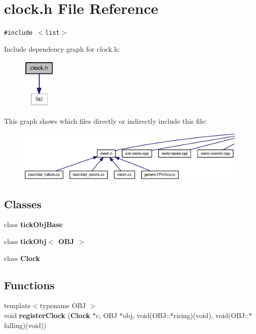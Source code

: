 \section{clock.h File Reference}
\label{clock_8h}
{\tt \#include $<$list$>$}\par


Include dependency graph for clock.h:\nopagebreak
\begin{figure}[H]
\begin{center}
\leavevmode
\includegraphics[width=46pt]{clock_8h__incl}
\end{center}
\end{figure}


This graph shows which files directly or indirectly include this file:\nopagebreak
\begin{figure}[H]
\begin{center}
\leavevmode
\includegraphics[width=420pt]{clock_8h__dep__incl}
\end{center}
\end{figure}
\subsection*{Classes}
\begin{CompactItemize}
\item 
class {\bf tickObjBase}
\item 
class {\bf tickObj$<$ OBJ $>$}
\item 
class {\bf Clock}
\end{CompactItemize}
\subsection*{Functions}
\begin{CompactItemize}
\item 
{\footnotesize template$<$typename OBJ $>$ }\\void {\bf registerClock} ({\bf Clock} $\ast$c, OBJ $\ast$obj, void(OBJ::$\ast$rising)(void), void(OBJ::$\ast$falling)(void))
\end{CompactItemize}


